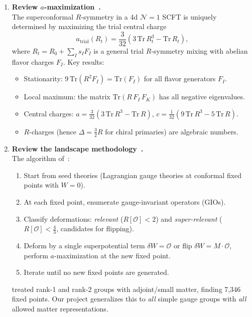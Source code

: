\documentclass[12pt]{article}
\begin{document}
\begin{enumerate}[label=\textbf{0.\arabic*}]

\item \textbf{Review $a$-maximization~\cite{IW}.} \\
  The superconformal $R$-symmetry in a 4d $\mathcal{N}=1$ SCFT is uniquely determined by maximizing the trial central charge
  \begin{equation}\label{eq:atrial}
    a_{\mathrm{trial}}(R_t) = \frac{3}{32}\!\left(3\,\mathrm{Tr}\,R_t^3 - \mathrm{Tr}\,R_t\right),
  \end{equation}
  where $R_t = R_0 + \sum_I s_I F_I$ is a general trial $R$-symmetry mixing with abelian flavor charges $F_I$.
  Key results:
  \begin{itemize}
    \item Stationarity: $9\,\mathrm{Tr}(R^2 F_I) = \mathrm{Tr}(F_I)$ for all flavor generators $F_I$.
    \item Local maximum: the matrix $\mathrm{Tr}(R\,F_I\,F_K)$ has all negative eigenvalues.
    \item Central charges: $a = \frac{3}{32}(3\,\mathrm{Tr}\,R^3 - \mathrm{Tr}\,R)$, \; $c = \frac{1}{32}(9\,\mathrm{Tr}\,R^3 - 5\,\mathrm{Tr}\,R)$.
    \item $R$-charges (hence $\Delta = \frac{3}{2}R$ for chiral primaries) are algebraic numbers.
  \end{itemize}

\item \textbf{Review the landscape methodology~\cite{CMNS}.} \\
  The algorithm of~\cite{CMNS}:
  \begin{enumerate}[label=(\roman*)]
    \item Start from seed theories (Lagrangian gauge theories at conformal fixed points with $W=0$).
    \item At each fixed point, enumerate gauge-invariant operators (GIOs).
    \item Classify deformations: \emph{relevant} ($R[\mathcal{O}] < 2$) and \emph{super-relevant} ($R[\mathcal{O}] < \tfrac{4}{3}$, candidates for flipping).
    \item Deform by a single superpotential term $\delta W = \mathcal{O}$ or flip $\delta W = M\cdot\mathcal{O}$, perform $a$-maximization at the new fixed point.
    \item Iterate until no new fixed points are generated.
  \end{enumerate}
  \cite{CMNS} treated rank-1 and rank-2 groups with adjoint/small matter, finding 7,346 fixed points.
  Our project generalizes this to \emph{all} simple gauge groups with \emph{all} allowed matter representations.


\end{enumerate}
\end{document}
